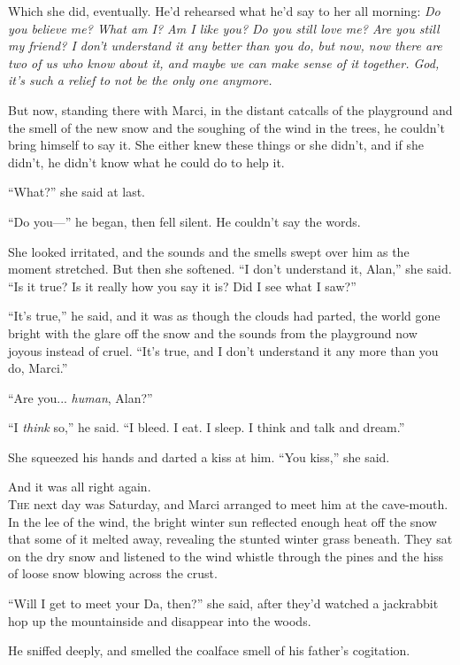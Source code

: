 \documentclass{article}
\begin{document}
Which she did, eventually.  He'd rehearsed what he'd say to her all
morning:  \textit{Do you believe me?  What am I?  Am I like you?  Do
you still love me?  Are you still my friend?  I don't understand it
any better than you do, but now, now there are two of us who know
about it, and maybe we can make sense of it together.  God, it's such
a relief to not be the only one anymore.}

But now, standing there with Marci, in the distant catcalls of the
playground and the smell of the new snow and the soughing of the wind
in the trees, he couldn't bring himself to say it.  She either knew
these things or she didn't, and if she didn't, he didn't know what he
could do to help it.

``What?'' she said at last.

``Do you---'' he began, then fell silent.  He couldn't say the words.

She looked irritated, and the sounds and the smells swept over him as
the moment stretched.  But then she softened.  ``I don't understand
it, Alan,'' she said.  ``Is it true?  Is it really how you say it is? 
Did I see what I saw?''

``It's true,'' he said, and it was as though the clouds had parted,
the world gone bright with the glare off the snow and the sounds from
the playground now joyous instead of cruel.  ``It's true, and I don't
understand it any more than you do, Marci.''

``Are you...  \textit{human}, Alan?''

``I \textit{think} so,'' he said.  ``I bleed.  I eat.  I sleep.  I
think and talk and dream.''

She squeezed his hands and darted a kiss at him.  ``You kiss,'' she
said.

And it was all right again.
\\
\lettrine[lines=3, lhang=.5, nindent=0pt, findent=2pt]{T}{he} next day was Saturday, and Marci arranged to meet him at the
cave-mouth.  In the lee of the wind, the bright winter sun reflected
enough heat off the snow that some of it melted away, revealing the
stunted winter grass beneath.  They sat on the dry snow and listened
to the wind whistle through the pines and the hiss of loose snow
blowing across the crust.

``Will I get to meet your Da, then?'' she said, after they'd watched a
jackrabbit hop up the mountainside and disappear into the woods.

He sniffed deeply, and smelled the coalface smell of his father's
cogitation.
\end{document}
